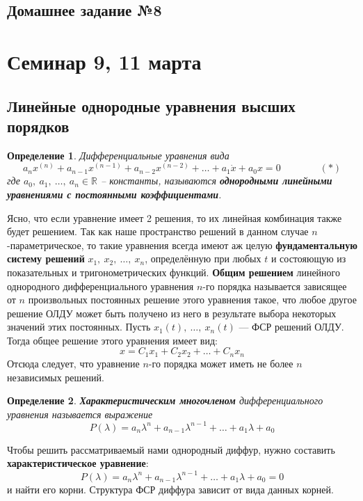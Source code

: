 \documentclass[a4paper,12pt]{article}
\newtheorem{definition}{Определение}
\newcommand{\R}{\mathbb{R}}
\newcommand{\dx}{\dot{x}}
\begin{document}
\subsection{Домашнее задание №8}


\newpage
\section{Семинар 9, 11 марта}

\subsection{Линейные однородные уравнения высших порядков}

\begin{definition}
	Дифференциальные уравнения вида
	\[a_nx^{(n)} + a_{n - 1}x^{(n - 1)} + a_{n - 2}x^{(n - 2)} + \ldots + a_1\dx + a_0 x = 0\qquad \qquad (*)\]
	где $a_0,\ a_1,\ \ldots,\ a_n \in \R$ -- константы, называются \textbf{однородными линейными уравнениями с постоянными коэффициентами}.
\end{definition}
Ясно, что если уравнение имеет 2 решения, то их линейная комбинация также будет решением.
Так как наше пространство решений в данном случае $n$-параметрическое, то такие уравнения всегда имеют аж целую \textbf{фундаментальную систему решений} $x_1,\ x_2,\ \ldots,\ x_n$, определённую при любых $t$ и состояющую из показательных и тригонометрических функций.
\textbf{Общим решением} линейного однородного дифференциального уравнения $n$-го порядка называется зависящее от $n$ произвольных постоянных решение этого уравнения такое, что
любое другое решение ОЛДУ может быть получено из него в результате выбора некоторых значений этих постоянных.
Пусть $x_1(t),\ \ldots,\ x_n(t)$ --- ФСР решений ОЛДУ.
Тогда общее решение этого уравнения имеет вид:
\[x = C_1x_1 + C_2x_2 +\ldots + C_nx_n\]
Отсюда следует, что уравнение $n$-го порядка может иметь не более $n$ независимых решений.
\begin{definition}
	\textbf{Характеристическим многочленом} дифференциального уравнения называется выражение
	\[P(\lambda) = a_n\lambda^n + a_{n - 1}\lambda^{n - 1} + \ldots + a_{1}\lambda + a_0\]
\end{definition}
Чтобы решить рассматриваемый нами однородный диффур, нужно составить \textbf{характеристическое уравнение}:
\[P(\lambda) = a_n\lambda^n + a_{n - 1}\lambda^{n - 1} + \ldots + a_{1}\lambda + a_0 = 0\]
и найти его корни. Структура ФСР диффура зависит от вида данных корней. 
\end{document}
